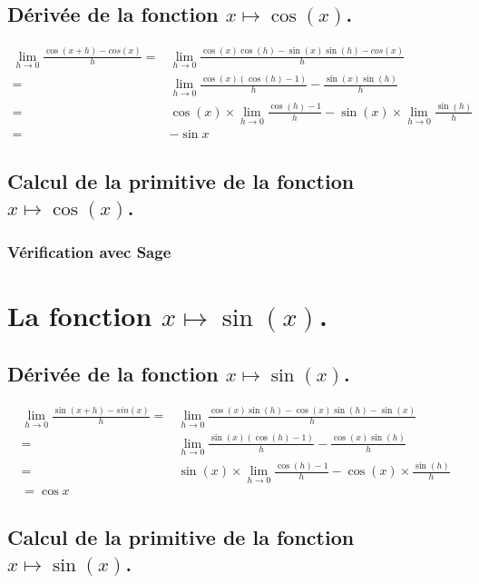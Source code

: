 \documentclass[a4paper,14pt]{extreport} %
\begin{document}
\subsection{Dérivée de la fonction $x \mapsto \cos(x)$.}

\begin{align*}
\lim_{h\to 0} \frac{\cos(x+h)-cos(x)}{h} = &\lim_{h\to 0} \frac{\cos(x)\cos(h)-\sin(x)\sin(h)-cos(x)}{h} \\ =& \lim_{h\to 0} \frac{\cos(x)(\cos(h)-1)}{h}-\frac{\sin(x)\sin(h)}{h}\\  =&  \cos(x) \times \lim_{h\to 0}\frac{\cos(h)-1}{h}- \sin(x) \times \lim_{h\to 0} \frac{\sin(h)}{h}\\  =& -\sin{x}
\end{align*}

\subsection{Calcul de la primitive de la fonction  $x \mapsto \cos(x)$.}


\subsubsection{Vérification avec Sage}


\section{La fonction  $x \mapsto \sin(x)$.}

\subsection{Dérivée de la fonction $x \mapsto \sin(x)$.}


\begin{align*}
\lim_{h\to 0} \frac{\sin(x+h)-sin(x)}{h} =& \lim_{h\to 0} \frac{\cos(x)\sin(h)-\cos(x)\sin(h)-\sin(x)}{h} \\= & \lim_{h\to 0} \frac{\sin(x)(\cos(h)-1)}{h}-\frac{\cos(x)\sin(h)}{h} \\=&\sin(x) \times  \lim_{h\to 0} \frac{\cos(h)-1}{h}-\cos(x) \times \frac{\sin(h)}{h} \\= \cos{x}
\end{align*}


\subsection{Calcul de la primitive de la fonction  $x \mapsto \sin(x)$.}
\end{document}
